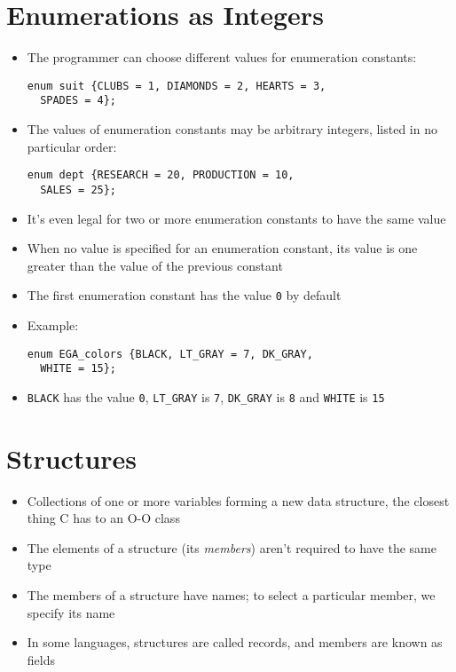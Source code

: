 \documentclass{article}
\begin{document}
\section{Enumerations as Integers}
\begin{itemize}
\item The programmer can choose different values for enumeration constants:
\begin{verbatim}
enum suit {CLUBS = 1, DIAMONDS = 2, HEARTS = 3,
  SPADES = 4};
\end{verbatim}

\item The values of enumeration constants may be arbitrary integers, listed in no particular order:
\begin{verbatim}
enum dept {RESEARCH = 20, PRODUCTION = 10,
  SALES = 25};
\end{verbatim}

\item It's even legal for two or more enumeration constants to have the same value

\item When no value is specified for an enumeration constant, its value is one greater than the value of the previous constant
\item The first enumeration constant has the value \verb!0! by default

\item Example:
\begin{verbatim}
enum EGA_colors {BLACK, LT_GRAY = 7, DK_GRAY,
  WHITE = 15};
\end{verbatim}
\item \verb!BLACK! has the value \verb!0!, \verb!LT_GRAY! is \verb!7!, \verb!DK_GRAY! is \verb!8! and \verb!WHITE! is \verb!15!
\end{itemize}



\section{Structures}
\begin{itemize}
\item Collections of one or more variables forming a new data structure, the closest thing C has to an O-O class

\item The elements of a structure (its \emph{members}) aren't required to have the same type

\item The members of a structure have names; to select a particular member, we specify its name

\item In some languages, structures are called records, and members are known as fields
\end{itemize}
\end{document}
